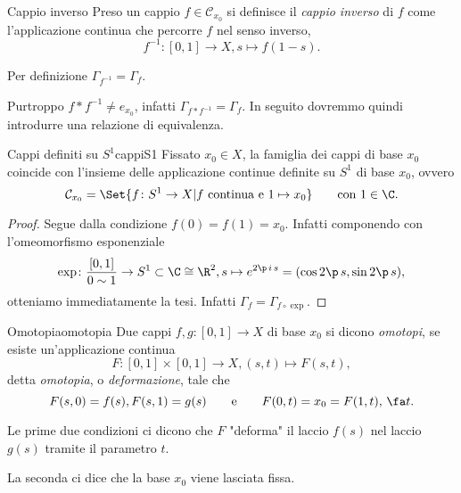 \begin{defn}{Cappio inverso}
	Preso un cappio \(f\in \mathcal{C}_{x_0}\) si definisce il \emph{cappio inverso} di \(f\) come l'applicazione continua che percorre \(f\) nel senso inverso,
	\[
		f^{-1}\colon [0,1] \to X, s \mapsto f(1-s).
	\]
\end{defn}

\begin{oss}
	Per definizione \(\Gamma_{f^{-1}} = \Gamma_f\).
\end{oss}

\begin{oss}
	Purtroppo \(f*f^{-1} \neq e_{x_0}\), infatti \(\Gamma_{f*f^{-1}} = \Gamma_f\).
	In seguito dovremmo quindi introdurre una relazione di equivalenza.
\end{oss}

\begin{prop}{Cappi definiti su \(S^1\)}{cappiS1}
	Fissato \(x_0\in X\), la famiglia dei cappi di base \(x_0\) coincide con l'insieme delle applicazione continue definite su \(S^1\) di base \(x_0\), ovvero
	\[
		\mathcal{C}_{x_0} = \Set{f\colon S^1 \to X | f \text{ continua e }1\mapsto x_0} \qquad\text{con }1\in \C.
	\]
\end{prop}

\begin{proof}
	Segue dalla condizione \(f(0)=f(1)=x_0\).
	Infatti componendo con l'omeomorfismo esponenziale
	\[
		\exp \colon \frac{[0,1]}{0\sim 1} \to S^1 \subset \C \cong \R^2, s\mapsto e^{2\p\,i\,s} = (\cos 2\p\,s, \sin 2\p\,s),
	\]
	otteniamo immediatamente la tesi.
	Infatti \(\Gamma_f = \Gamma_{f\circ \exp}\).
\end{proof}

\begin{defn}{Omotopia}{omotopia}
	Due cappi \(f,g\colon [0,1] \to X\) di base \(x_0\) si dicono \emph{omotopi}, se esiste un'applicazione continua
	\[
		F\colon [0,1] \times [0,1] \to X, (s,t) \mapsto F(s,t),
	\]
	detta \emph{omotopia}, o \emph{deformazione}, tale che
	\[
		F(s,0) = f(s), F(s,1) = g(s) \qquad\text{e}\qquad F(0,t) = x_0 = F(1,t),\,\fa t.
	\]
\end{defn}

\begin{oss}
	Le prime due condizioni ci dicono che \(F\) "deforma" il laccio \(f(s)\) nel laccio \(g(s)\) tramite il parametro \(t\).

	La seconda ci dice che la base \(x_0\) viene lasciata fissa.
\end{oss}

